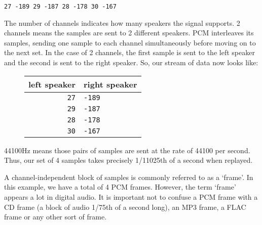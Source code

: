 \begin{Verbatim}[frame=single]
27 -189 29 -187 28 -178 30 -167
\end{Verbatim}

The number of channels indicates how many speakers the signal
supports.
2 channels means the samples are sent to 2 different speakers.
PCM interleaves its samples, sending one sample to
each channel simultaneously before moving on to the next set.
In the case of 2 channels, the first sample is sent to the
left speaker and the second is sent to the right speaker.
So, our stream of data now looks like:

\begin{figure}[h]
\begin{tabular}{| r | l |}
\hline
left speaker & right speaker \\
\hline
\texttt{27} & \texttt{-189} \\
\texttt{29} & \texttt{-187} \\
\texttt{28} & \texttt{-178} \\
\texttt{30} & \texttt{-167} \\
\hline
\end{tabular}
\end{figure}

\noindent
44100Hz means those pairs of samples are sent at the rate of
44100 per second.
Thus, our set of 4 samples takes precisely 1/11025th of a second
when replayed.

A channel-independent block of samples is commonly referred to
as a `frame'.
In this example, we have a total of 4 PCM frames.
However, the term `frame' appears a lot in digital audio.
It is important not to confuse a PCM frame with a CD frame
(a block of audio 1/75th of a second long), an MP3 frame,
a FLAC frame or any other sort of frame.
